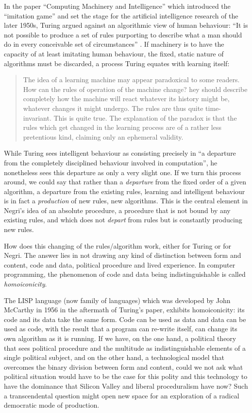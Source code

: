 \documentclass[12pt,oneside]{memoir}
\begin{document}
In the paper ``Computing Machinery and Intelligence'' which introduced the ``imitation game'' and set the stage for the artificial intelligence research of the later 1950s, Turing  argued against an algorithmic view of human behaviour: ``It is not possible to produce a set of rules purporting to describe what a man should do in every conceivable set of circumstances'' \citep[452]{Turing1950}. If machinery is to have the capacity of at least imitating human behaviour, the fixed, static nature of algorithms must be discarded, a process Turing equates with learning itself: 

\begin{quote}
The idea of a learning machine may appear paradoxical to some readers. How can the rules of operation of the machine change? hey should describe completely how the machine will react whatever its history might be, whatever changes it might undergo. The rules are thus quite time-invariant. This is quite true. The explanation of the paradox is that the rules which get changed in the learning process are of a rather less pretentious kind, claiming only an ephemeral validity.\cite[458]{Turing1950}
	\end{quote}

While Turing sees intelligent behaviour as consisting precisely in ``a departure from the completely disciplined behaviour involved in computation'', he nonetheless sees this departure as only a very slight one. If we turn this process around, we could say that rather than a \textit{departure} from the fixed order of a given algorithm, a departure from the existing rules, learning and intelligent behaviour is in fact a \textit{production }of new rules, new algorithms. This is the central element in Negri's idea of an absolute procedure, a procedure that is not bound by any existing rules, and which does not \textit{depart} from rules but is constantly producing new rules. 
	
How does this changing of the rules/algorithm work, either for Turing or for Negri. The answer lies in not drawing any kind of distinction between form and content, code and data, political procedure and lived experience. In computer programming, the phenomenon of code and data being indistinguishable is called \textit{homoiconicity}.
	
The LISP language (now family of languages) which was developed by John McCarthy in 1956 in the aftermath of Turing's paper, exhibits homoiconicity: its code and its data take the same form. Code can be used as data and data can be used as code, with the result that a program can re-write itself, can change its own algorithm as it is running. If we have, on the one hand, a political theory that sees political procedure and the multitude as indistinguishable elements of a single political subject, and on the other hand, a technological model that overcomes the binary division between form and content, could we not ask what political situation would have to be the case for this polity and this technology to have the dominance that Silicon Valley and liberal proceduralism have now? Such a transcendental question might open new space for an exploration of a radical democratic mode of production. 
\end{document}
